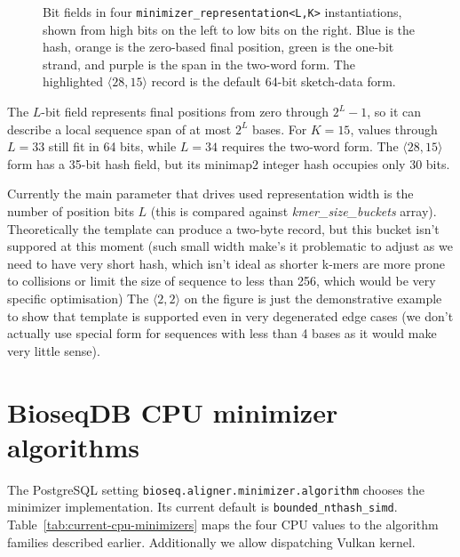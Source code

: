 \begin{figure}[H]
\caption{Bit fields in four \texttt{minimizer\_representation<L,K>}
instantiations, shown from high bits on the left to low bits on the right.
Blue is the hash, orange is the zero-based final position, green is the
one-bit strand, and purple is the span in the two-word form.  The highlighted
$\langle28,15\rangle$ record is the default 64-bit sketch-data form.}
\label{fig:minimizer-representation-layout}
\end{figure}

The $L$-bit field represents final positions from zero through
$2^L-1$, so it can describe a local sequence span of at most $2^L$ bases.
For $K=15$, values through $L=33$ still fit in 64 bits, while $L=34$
requires the two-word form.  The $\langle28,15\rangle$ form has a 35-bit hash
field, but its minimap2 integer hash occupies only 30 bits.

Currently the main parameter that drives used representation width is the number of position bits $L$ (this is compared against \emph{kmer\_size\_buckets} array).
Theoretically the template can produce a two-byte record, but this bucket isn't suppored at this moment (such small width make's it problematic to adjust as we need to have very short hash, which isn't ideal as shorter k-mers are more prone to collisions or limit the size of sequence to less than 256, which would be very specific optimisation)
The $\langle2,2\rangle$ on the figure is just the demonstrative example to show that template is supported even in very degenerated edge cases (we don't actually use special form for sequences with less than 4 bases as it would make very little sense).


\section{BioseqDB CPU minimizer algorithms}
\label{sec:configured-cpu-minimizers}

The PostgreSQL setting \texttt{bioseq.aligner.minimizer.algorithm} chooses the
minimizer implementation. Its current default is \texttt{bounded\_nthash\_simd}. Table~\ref{tab:current-cpu-minimizers}
maps the four CPU values to the algorithm families described earlier. Additionally we allow dispatching Vulkan kernel.

